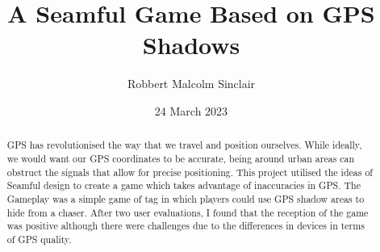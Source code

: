 \documentclass{l4proj}
\begin{document}
\title{A Seamful Game Based on GPS Shadows}
\author{Robbert Malcolm Sinclair}
\date{24 March 2023}

\maketitle

\begin{abstract}
    GPS has revolutionised the way
    that we travel and position ourselves. While ideally, we would want our GPS
    coordinates to be accurate, being around urban areas can obstruct the signals
    that allow for precise positioning. This project utilised the ideas of Seamful
    design to create a game which takes advantage of inaccuracies in GPS. The Gameplay
    was a simple game of tag in which players could use GPS shadow areas to hide
    from a chaser. After two user evaluations, I found that the reception of the game
    was positive although there were challenges due to the differences in devices in
    terms of GPS quality.  
\end{abstract}


%
%
\def\consentname {Robbert Malcolm Sinclair} %
\def\consentdate {24 March 2023} %
%
\educationalconsent


\tableofcontents
\end{document}
